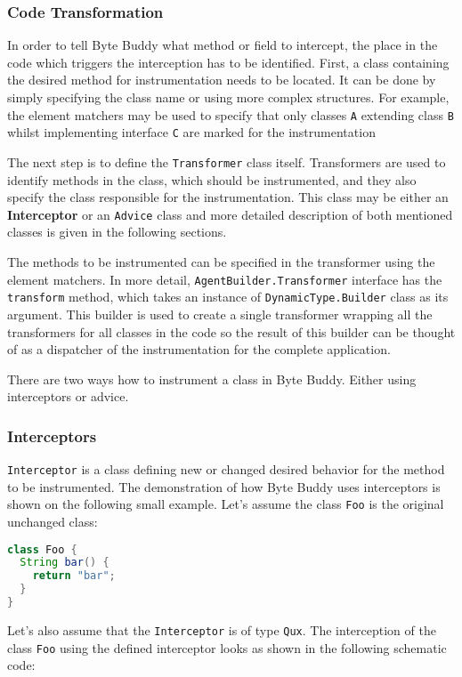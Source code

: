 \subsubsection{Code Transformation}
\label{back:code_transform}
In order to tell Byte Buddy what method or field to intercept, the place in the code which triggers the interception has to be identified. First, a class containing the desired method for instrumentation needs to be located. It can be done by simply specifying the class name or using more complex structures. For example, the element matchers may be used to specify that only classes \texttt{A} extending class \texttt{B} whilst implementing interface \texttt{C} are marked for the instrumentation

The next step is to define the \texttt{Transformer} class itself. Transformers are used to identify methods in the class, which should be instrumented, and they also specify the class responsible for the instrumentation. This class may be either an \textbf{Interceptor} or an \texttt{Advice} class and more detailed description of both mentioned classes is given in the following sections.

The methods to be instrumented can be specified in the transformer using the element matchers. In more detail, \texttt{AgentBuilder.Transformer} interface has the \texttt{transform} method, which takes an instance of \texttt{DynamicType.Builder} class as its argument. This builder is used to create a single transformer wrapping all the transformers for all classes in the code so the result of this builder can be thought of as a dispatcher of the instrumentation for the complete application.

There are two ways how to instrument a class in Byte Buddy. Either using interceptors or advice.
\subsubsection{Interceptors}
\texttt{Interceptor} is a class defining new or changed desired behavior for the method to be instrumented.  The demonstration of how Byte Buddy uses interceptors is shown on the following small example. Let's assume the class \texttt{Foo} is the original unchanged class:
\begin{lstlisting}[language=Java]
class Foo {
  String bar() {
    return "bar"; 
  }
}
\end{lstlisting}
	
Let's also assume that the \texttt{Interceptor} is of type \texttt{Qux}. The interception of the class \texttt{Foo} using the defined interceptor looks as shown in the following schematic code:

